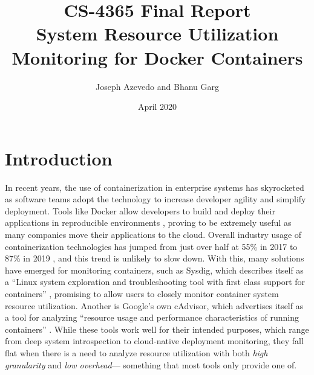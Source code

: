 \documentclass[a4paper,11pt]{article}
\title{
    \vspace{-1.35em}
    \textbf{\huge{CS-4365 Final Report}}\\[1pt]
    System Resource Utilization Monitoring for Docker Containers
    \vspace{-0.5em}
}
\author{Joseph Azevedo and Bhanu Garg}
\date{\vspace{-0.7em}\vspace{-\parskip}April 2020}
\newcommand{\granularity}{\textit{high granularity}\xspace}
\newcommand{\overhead}{\textit{low overhead}\xspace}
\begin{document}
\maketitle

\vspace{-\parskip}
\vspace{-2em}
\section{Introduction}

In recent years, the use of containerization in enterprise systems has skyrocketed as software teams adopt the technology
to increase developer agility and simplify deployment.
Tools like Docker allow developers to build and deploy their applications in reproducible environments \cite{Docker-Overview},
proving to be extremely useful as many companies move their applications to the cloud.
Overall industry usage of containerization technologies has jumped from just over half at 55\% in 2017 to 87\% in 2019 \cite{Portworx},
and this trend is unlikely to slow down. With this, many solutions have emerged for monitoring containers,
such as Sysdig, which describes itself as a ``Linux system exploration and troubleshooting tool
with first class support for containers'' \cite{SysDig}, 
promising to allow users to closely monitor container system resource utilization. Another is Google's own cAdvisor,
which advertises itself as a tool for analyzing ``resource usage and performance characteristics of running containers'' \cite{Cadvisor}.
While these tools work well for their intended purposes, which range from deep system introspection to cloud-native deployment monitoring,
they fall flat when there is a need to analyze resource utilization with both \granularity and \overhead---%
something that most tools only provide one of.
\end{document}
